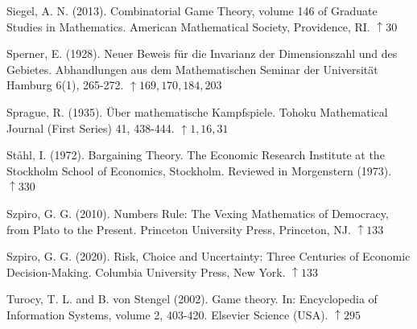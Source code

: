 \documentclass[12pt]{article}
\begin{document}
Siegel, A. N. (2013). Combinatorial Game Theory, volume 146 of Graduate Studies in Mathematics. American Mathematical Society, Providence, RI. $\uparrow 30$

Sperner, E. (1928). Neuer Beweis für die Invarianz der Dimensionszahl und des Gebietes. Abhandlungen aus dem Mathematischen Seminar der Universität Hamburg 6(1), 265-272. $\uparrow 169,170,184,203$

Sprague, R. (1935). Über mathematische Kampfspiele. Tohoku Mathematical Journal (First Series) 41, 438-444. $\uparrow 1,16,31$

Ståhl, I. (1972). Bargaining Theory. The Economic Research Institute at the Stockholm School of Economics, Stockholm. Reviewed in Morgenstern (1973). $\uparrow 330$

Szpiro, G. G. (2010). Numbers Rule: The Vexing Mathematics of Democracy, from Plato to the Present. Princeton University Press, Princeton, NJ. $\uparrow 133$

Szpiro, G. G. (2020). Risk, Choice and Uncertainty: Three Centuries of Economic Decision-Making. Columbia University Press, New York. $\uparrow 133$

Turocy, T. L. and B. von Stengel (2002). Game theory. In: Encyclopedia of Information Systems, volume 2, 403-420. Elsevier Science (USA). $\uparrow 295$
\end{document}
